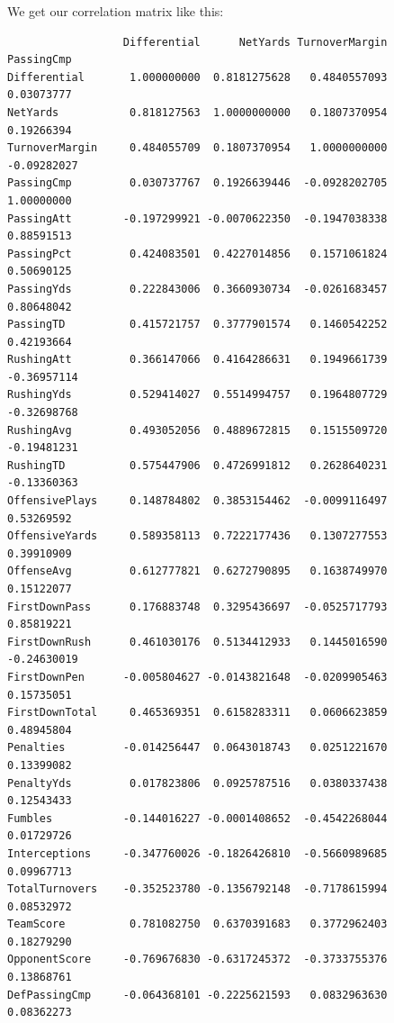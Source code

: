 \documentclass[
  letterpaper,
  DIV=11,
  numbers=noendperiod]{scrreprt}
\newenvironment{Shaded}{\begin{snugshade}}{\end{snugshade}}
\newcommand{\FunctionTok}[1]{\textcolor[rgb]{0.28,0.35,0.67}{#1}}
\newcommand{\NormalTok}[1]{\textcolor[rgb]{0.00,0.23,0.31}{#1}}
\newcommand{\OtherTok}[1]{\textcolor[rgb]{0.00,0.23,0.31}{#1}}
\newcommand{\SpecialCharTok}[1]{\textcolor[rgb]{0.37,0.37,0.37}{#1}}
\begin{document}
We get our correlation matrix like this:

\begin{Shaded}
\end{Shaded}

\begin{verbatim}
                  Differential      NetYards TurnoverMargin  PassingCmp
Differential       1.000000000  0.8181275628   0.4840557093  0.03073777
NetYards           0.818127563  1.0000000000   0.1807370954  0.19266394
TurnoverMargin     0.484055709  0.1807370954   1.0000000000 -0.09282027
PassingCmp         0.030737767  0.1926639446  -0.0928202705  1.00000000
PassingAtt        -0.197299921 -0.0070622350  -0.1947038338  0.88591513
PassingPct         0.424083501  0.4227014856   0.1571061824  0.50690125
PassingYds         0.222843006  0.3660930734  -0.0261683457  0.80648042
PassingTD          0.415721757  0.3777901574   0.1460542252  0.42193664
RushingAtt         0.366147066  0.4164286631   0.1949661739 -0.36957114
RushingYds         0.529414027  0.5514994757   0.1964807729 -0.32698768
RushingAvg         0.493052056  0.4889672815   0.1515509720 -0.19481231
RushingTD          0.575447906  0.4726991812   0.2628640231 -0.13360363
OffensivePlays     0.148784802  0.3853154462  -0.0099116497  0.53269592
OffensiveYards     0.589358113  0.7222177436   0.1307277553  0.39910909
OffenseAvg         0.612777821  0.6272790895   0.1638749970  0.15122077
FirstDownPass      0.176883748  0.3295436697  -0.0525717793  0.85819221
FirstDownRush      0.461030176  0.5134412933   0.1445016590 -0.24630019
FirstDownPen      -0.005804627 -0.0143821648  -0.0209905463  0.15735051
FirstDownTotal     0.465369351  0.6158283311   0.0606623859  0.48945804
Penalties         -0.014256447  0.0643018743   0.0251221670  0.13399082
PenaltyYds         0.017823806  0.0925787516   0.0380337438  0.12543433
Fumbles           -0.144016227 -0.0001408652  -0.4542268044  0.01729726
Interceptions     -0.347760026 -0.1826426810  -0.5660989685  0.09967713
TotalTurnovers    -0.352523780 -0.1356792148  -0.7178615994  0.08532972
TeamScore          0.781082750  0.6370391683   0.3772962403  0.18279290
OpponentScore     -0.769676830 -0.6317245372  -0.3733755376  0.13868761
DefPassingCmp     -0.064368101 -0.2225621593   0.0832963630  0.08362273

\end{verbatim}
\end{document}
